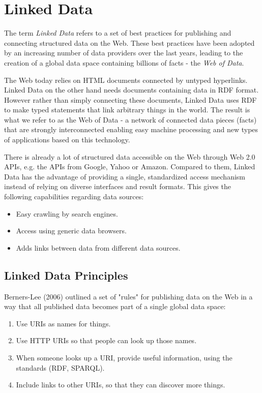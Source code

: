 \section{Linked Data}

The term \textit{Linked Data} refers to a set of best practices for publishing and connecting
structured data on the Web. These best practices have been adopted by an increasing number of data providers over the last years, leading to the creation of a global data space containing billions of facts - the \textit{Web of Data}. 

The Web today relies on HTML documents connected by untyped hyperlinks. Linked Data on the other hand needs documents containing data in RDF format. However rather than simply connecting these documents, Linked Data uses RDF to make typed statements that link arbitrary things in the world. The result is what we refer to as the
Web of Data - a network of connected data pieces (facts) that are strongly interconnected enabling easy machine processing and new types of applications based on this technology.

There is already a lot of structured data accessible on the Web through Web 2.0 APIs, e.g. the APIs from Google, Yahoo or Amazon. Compared to them, Linked Data has the advantage of providing a single, standardized access mechanism instead of relying on diverse interfaces and result formats. This gives the following capabilities regarding data sources:

\begin{itemize}
    \item Easy crawling by search engines.
    \item Access using generic data browsers.
    \item Adds links between data from different data sources.
\end{itemize}

\subsection{Linked Data Principles}
Berners-Lee (2006) outlined a set of "rules" for publishing data on the Web in a way that all
published data becomes part of a single global data space:
\begin{enumerate}
    \item Use URIs as names for things.
    \item Use HTTP URIs so that people can look up those names.
    \item When someone looks up a URI, provide useful information, using the standards
(RDF, SPARQL).
    \item Include links to other URIs, so that they can discover more things.
\end{enumerate}

